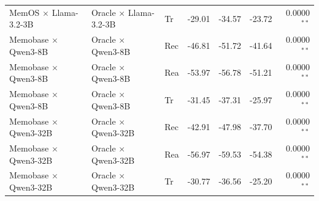 \begin{table}[h]
\begin{tabular}{@{}ll l rrr r@{}}
MemOS $\times$ Llama-3.2-3B & Oracle $\times$ Llama-3.2-3B & Tr & -29.01 & -34.57 & -23.72 & 0.0000$^{**}$ \\
Memobase $\times$ Qwen3-8B & Oracle $\times$ Qwen3-8B & Rec & -46.81 & -51.72 & -41.64 & 0.0000$^{**}$ \\
Memobase $\times$ Qwen3-8B & Oracle $\times$ Qwen3-8B & Rea & -53.97 & -56.78 & -51.21 & 0.0000$^{**}$ \\
Memobase $\times$ Qwen3-8B & Oracle $\times$ Qwen3-8B & Tr & -31.45 & -37.31 & -25.97 & 0.0000$^{**}$ \\
Memobase $\times$ Qwen3-32B & Oracle $\times$ Qwen3-32B & Rec & -42.91 & -47.98 & -37.70 & 0.0000$^{**}$ \\
Memobase $\times$ Qwen3-32B & Oracle $\times$ Qwen3-32B & Rea & -56.97 & -59.53 & -54.38 & 0.0000$^{**}$ \\
Memobase $\times$ Qwen3-32B & Oracle $\times$ Qwen3-32B & Tr & -30.77 & -36.56 & -25.20 & 0.0000$^{**}$ \\
\bottomrule
\end{tabular}
\end{table}
